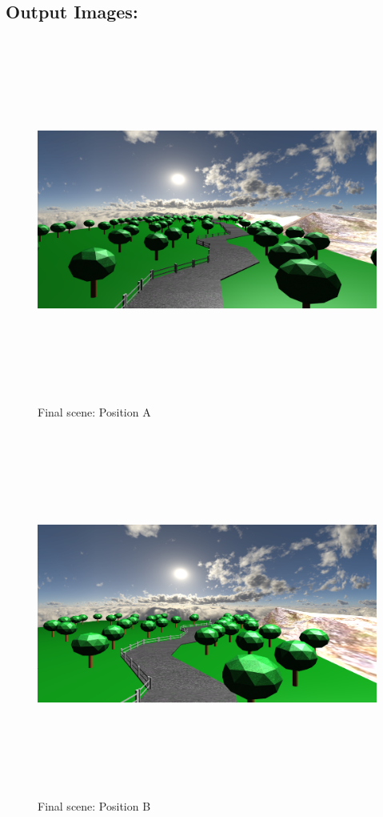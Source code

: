\documentclass{report}
\begin{document}
\subsection{Output Images:}
\begin{figure}[h!]
      \centering
        \includegraphics[width=12cm,height=12cm,keepaspectratio]{result.png}
        \caption{Final scene: Position A}
    \end{figure}
    \medskip
    \begin{figure}[h!]
      \centering
        \includegraphics[width=12cm,height=12cm,keepaspectratio]{result2.png}
        \caption{Final scene: Position B}
    \end{figure}
    \medskip
\end{document}
